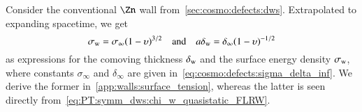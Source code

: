    Consider the conventional $\Zn$ wall from~\cref{sec:cosmo:defects:dws}. Extrapolated to expanding spacetime, we get
    \begin{equation}\label{eq:PT:symm_dws:surface_tension_and_thickness_FLRW}
         \sigma\ped{w} = \sigma_\infty \pclosed{1-\upsilon}^{3/2} %
         \quad \text{and} \quad  %
         a\delta\ped{w} = \delta_\infty \pclosed{1-\upsilon}^{-1/2}
    \end{equation}
    as expressions for the comoving thickness $\delta_\mathrm{w}$ and the surface energy density $\sigma_\mathrm{w}$, where constants $\sigma_\infty$ and $\delta_\infty$ are given in~\cref{eq:cosmo:defects:sigma_delta_inf}. We derive the former in~\cref{app:walls:surface_tension}, whereas the latter is seen directly from~\cref{eq:PT:symm_dws:chi_w_quasistatic_FLRW}.





